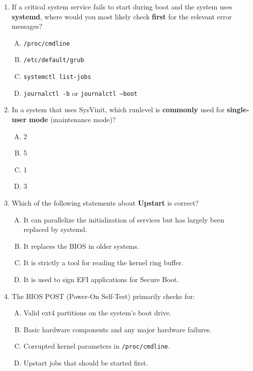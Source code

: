 \documentclass[12pt,a4paper]{report}
\begin{document}
\begin{enumerate}[1.]
    \item If a critical system service fails to start during boot and the system uses \textbf{systemd}, where would you most likely check \textbf{first} for the relevant error messages?
      \begin{enumerate}[A)]
        \item \texttt{/proc/cmdline}
        \item \texttt{/etc/default/grub}
        \item \texttt{systemctl list-jobs}
        \item \texttt{journalctl -b} or \texttt{journalctl --boot}
      \end{enumerate}
    
    \item In a system that uses SysVinit, which runlevel is \textbf{commonly} used for \textbf{single-user mode} (maintenance mode)?
      \begin{enumerate}[A)]
        \item 2
        \item 5
        \item 1
        \item 3
      \end{enumerate}
    
    \item Which of the following statements about \textbf{Upstart} is correct?
      \begin{enumerate}[A)]
        \item It can parallelize the initialization of services but has largely been replaced by systemd.
        \item It replaces the BIOS in older systems.
        \item It is strictly a tool for reading the kernel ring buffer.
        \item It is used to sign EFI applications for Secure Boot.
      \end{enumerate}
    
    \item The BIOS POST (Power-On Self-Test) primarily checks for:
      \begin{enumerate}[A)]
        \item Valid ext4 partitions on the system’s boot drive.
        \item Basic hardware components and any major hardware failures.
        \item Corrupted kernel parameters in \texttt{/proc/cmdline}.
        \item Upstart jobs that should be started first.
      \end{enumerate}
    
    \end{enumerate}
\end{document}
